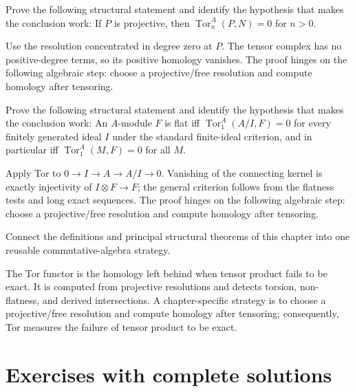 \begin{problem}\label{prob:v26-problem-10}
Prove the following structural statement and identify the hypothesis that makes the conclusion work: If $P$ is projective, then $\operatorname{Tor}_n^A(P,N)=0$ for $n>0$.
\end{problem}
\begin{solution}
Use the resolution concentrated in degree zero at $P$. The tensor complex has no positive-degree terms, so its positive homology vanishes. The proof hinges on the following algebraic step: choose a projective/free resolution and compute homology after tensoring.
\end{solution}

\begin{problem}\label{prob:v26-problem-11}
Prove the following structural statement and identify the hypothesis that makes the conclusion work: An $A$-module $F$ is flat iff $\operatorname{Tor}_1^A(A/I,F)=0$ for every finitely generated ideal $I$ under the standard finite-ideal criterion, and in particular iff $\operatorname{Tor}_1^A(M,F)=0$ for all $M$.
\end{problem}
\begin{solution}
Apply Tor to $0\to I\to A\to A/I\to0$. Vanishing of the connecting kernel is exactly injectivity of $I\otimes F\to F$; the general criterion follows from the flatness tests and long exact sequences. The proof hinges on the following algebraic step: choose a projective/free resolution and compute homology after tensoring.
\end{solution}

\begin{problem}\label{prob:v26-problem-12}
Connect the definitions and principal structural theorems of this chapter into one reusable commutative-algebra strategy.
\end{problem}
\begin{solution}
The Tor functor is the homology left behind when tensor product fails to be exact. It is computed from projective resolutions and detects torsion, non-flatness, and derived intersections. A chapter-specific strategy is to choose a projective/free resolution and compute homology after tensoring; consequently, Tor measures the failure of tensor product to be exact.
\end{solution}

\section{Exercises with complete solutions}

